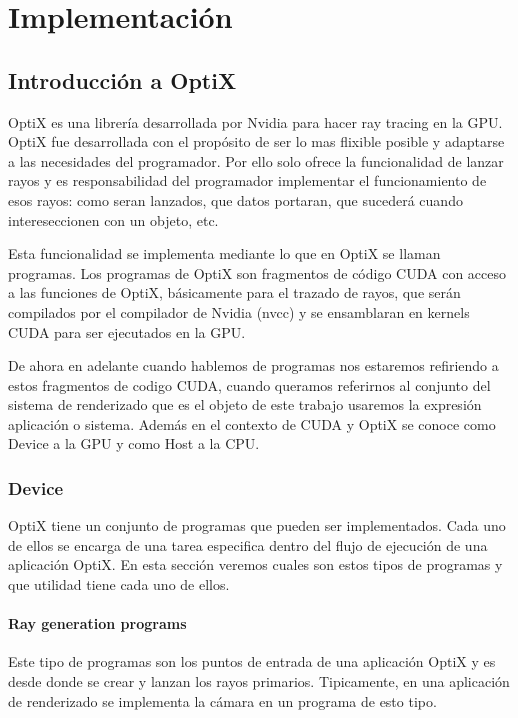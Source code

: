 \chapter{Implementación}

\section{Introducción a OptiX}

OptiX es una librería desarrollada por Nvidia para hacer ray tracing en la GPU. OptiX fue desarrollada con el propósito de ser lo mas flixible posible y adaptarse a las necesidades del programador. Por ello solo ofrece la funcionalidad de lanzar rayos y es responsabilidad del programador implementar el funcionamiento de esos rayos: como seran lanzados, que datos portaran, que sucederá cuando intereseccionen con un objeto, etc.

\medskip

Esta funcionalidad se implementa mediante lo que en OptiX se llaman programas. Los programas de OptiX son fragmentos de código CUDA con acceso a las funciones de OptiX, básicamente para el trazado de rayos, que serán compilados por el compilador de Nvidia (nvcc) y se ensamblaran en kernels CUDA para ser ejecutados en la GPU. 

\medskip
De ahora en adelante cuando hablemos de programas nos estaremos refiriendo a estos fragmentos de codigo CUDA, cuando queramos referirnos al conjunto del sistema de renderizado que es el objeto de este trabajo usaremos la expresión aplicación o sistema. Además en el contexto de CUDA y OptiX se conoce como Device a la GPU y como Host a la CPU.


\subsection{Device}

OptiX tiene un conjunto de programas que pueden ser implementados. Cada uno de ellos se encarga de una tarea especifica dentro del flujo de ejecución de una aplicación OptiX. En esta sección veremos cuales son estos tipos de programas y que utilidad tiene cada uno de ellos.  

\subsubsection{Ray generation programs}

Este tipo de programas son los puntos de entrada de una aplicación OptiX y es desde donde se crear y lanzan los rayos primarios. Tipicamente, en una aplicación de renderizado se implementa la cámara en un programa de esto tipo.

